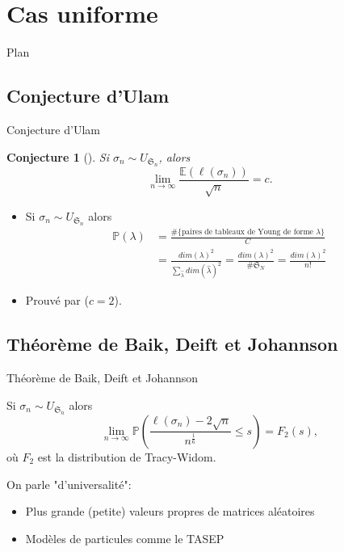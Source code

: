 \documentclass[french]{beamer}
\newtheorem{conjecture}[theorem]{Conjecture}
\begin{document}
\section{Cas uniforme}
\begin{frame}{Plan}
\tableofcontents[currentsection,currentsubsection,
    hideothersubsections, 
    sectionstyle=show/shaded,
]
\end{frame}
\subsection{Conjecture d'Ulam}
\begin{frame}{Conjecture d'Ulam}
    \begin{conjecture}[\cite{ulam}]
    Si $\sigma_n \sim {U}_{\mathfrak{S}_n}$, alors
    $$\lim_{n\to \infty}\frac{\mathbb{E}(\ell(\sigma_n))}{\sqrt{n}}=c.$$ 
    \end{conjecture}
\begin{itemize}
    \item Si $\sigma_n \sim {U}_{\mathfrak{S}_n}$ alors 
    \begin{align*}
    \mathbb{P}(\lambda)&=\frac{\#\{\text{paires de tableaux de Young de forme } \lambda\}}{C}\\&=\frac{dim(\lambda)^2}{\sum_{\hat\lambda} dim( \hat\lambda)^2}=\frac{dim(\lambda)^2}{\# \mathfrak{S}_N}=\frac{dim(\lambda)^2}{n!} 
    \end{align*}
    \item Prouvé par \cite{vershik} ($c=2$).
\end{itemize}


\end{frame}

\subsection{Théorème de Baik, Deift et Johannson}
\begin{frame}{Théorème de Baik, Deift et Johannson}
    \begin{theorem} 
Si $\sigma_n \sim U_{\mathfrak{S}_n}$ alors
\begin{equation*} 
\lim_{n \to \infty} \mathbb{P}\left(\frac{\ell(\sigma_n)-2\sqrt{n}}{n^\frac 16}\leq s\right)=F_2(s),
\end{equation*}
o\`u  $F_2$ est la distribution de Tracy-Widom.
\end{theorem}
On parle "d'universalité":
\begin{itemize}
    \item Plus grande (petite) valeurs propres de matrices aléatoires
    \item Modèles de particules comme le TASEP
\end{itemize}
\end{frame}
\end{document}
